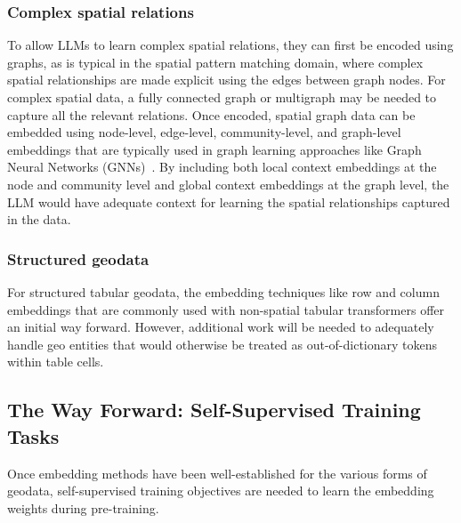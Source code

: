 \subsubsection{Complex spatial relations} %
To allow LLMs to learn complex spatial relations, they can first be encoded using graphs, as is typical in the spatial pattern matching domain, where complex spatial relationships are made explicit using the edges between graph nodes.
For complex spatial data, a fully connected graph or multigraph may be needed to capture all the relevant relations. 
Once encoded, spatial graph data can be embedded using node-level, edge-level, community-level, and graph-level embeddings that are typically used in graph learning approaches like Graph Neural Networks (GNNs)~\cite{Bai2019,Krlevza2016,Liu2020Neural}.
By including both local context embeddings at the node and community level and global context embeddings at the graph level, the LLM would have adequate context for learning the spatial relationships captured in the data.

\subsubsection{Structured geodata}  %
For structured tabular geodata, the embedding techniques like row and column embeddings that are commonly used with non-spatial tabular transformers offer an initial way forward.
However, additional work will be needed to adequately handle geo entities that would otherwise be treated as out-of-dictionary tokens within table cells.



\subsection{The Way Forward: Self-Supervised Training Tasks}
Once embedding methods have been well-established for the various forms of geodata, self-supervised training objectives are needed to learn the embedding weights during pre-training.

